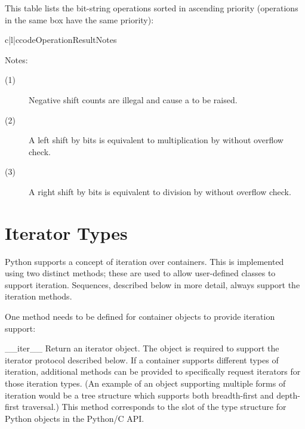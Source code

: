 This table lists the bit-string operations sorted in ascending
priority (operations in the same box have the same priority):

\begin{tableiii}{c|l|c}{code}{Operation}{Result}{Notes}
  \hline
\end{tableiii}

\noindent
Notes:
\begin{description}
\item[(1)] Negative shift counts are illegal and cause a
 to be raised.
\item[(2)] A left shift by  bits is equivalent to
multiplication by  without overflow check.
\item[(3)] A right shift by  bits is equivalent to
division by  without overflow check.
\end{description}


\section{Iterator Types \label{typeiter}}


Python supports a concept of iteration over containers.  This is
implemented using two distinct methods; these are used to allow
user-defined classes to support iteration.  Sequences, described below
in more detail, always support the iteration methods.

One method needs to be defined for container objects to provide
iteration support:

\begin{methoddesc}[container]{__iter__}{}
  Return an iterator object.  The object is required to support the
  iterator protocol described below.  If a container supports
  different types of iteration, additional methods can be provided to
  specifically request iterators for those iteration types.  (An
  example of an object supporting multiple forms of iteration would be
  a tree structure which supports both breadth-first and depth-first
  traversal.)  This method corresponds to the  slot of
  the type structure for Python objects in the Python/C API.
\end{methoddesc}


